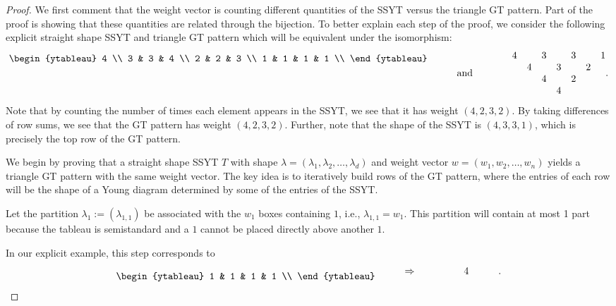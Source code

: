 \documentclass[10pt]{article}
\theoremstyle{plain}
\theoremstyle{definition}
\newcommand{\Rar}{\Rightarrow}
\begin{document}
\begin{proof}
We first comment that the weight vector is counting different quantities of the SSYT versus the triangle GT pattern. Part of the proof is showing that these quantities are related through the bijection. To better explain each step of the proof, we consider the following explicit straight shape SSYT and triangle GT pattern which will be equivalent under the isomorphism:
\[
\begin{ytableau}
4 \\ 
3 & 3 & 4 \\
2 & 2 & 3 \\ 
1 & 1 & 1 & 1 \\ 
\end{ytableau} \quad\qquad \raisebox{-15pt}{\textrm{and}} \qquad\qquad \raisebox{-15pt}{$\begin{matrix}
4 & & 3 & & 3 & & 1 \\
& 4 & & 3 & & 2 & \\ 
& & 4 & & 2 & & \\ 
& & & 4 & & & 
\end{matrix}$.}
\]
Note that by counting the number of times each element appears in the SSYT, we see that it has weight $(4,2,3,2)$. By taking differences of row sums, we see that the GT pattern has weight $(4,2,3,2)$.  Further, note that the shape of the SSYT is $(4,3,3,1)$, which is precisely the top row of the GT pattern.

We begin by proving that a straight shape SSYT $T$ with shape $\lambda = (\lambda_1, \lambda_2, \dots, \lambda_d)$ and weight vector $w= (w_1, w_2, \dots, w_n) $ yields a triangle GT pattern with the same weight vector. The key idea is to iteratively build rows of the GT pattern, where the entries of each row will be the shape of a Young diagram determined by some of the entries of the SSYT.

Let the partition $\lambda_1:= (\lambda_{1,1})$ be associated with the $w_1$ boxes containing $1$, i.e., $\lambda_{1,1}=w_1$. This partition will contain at most 1 part because the tableau is semistandard and a $1$ cannot be placed directly above another $1$. 

In our explicit example, this step corresponds to
\[
\begin{ytableau} 
1 & 1 & 1 & 1 \\ 
\end{ytableau} \quad\qquad \raisebox{5pt}{$\Rar$} \qquad \raisebox{5pt}{$\begin{matrix}
& & & 4 & & & 
\end{matrix}$.}
\]


\end{proof}
\end{document}
